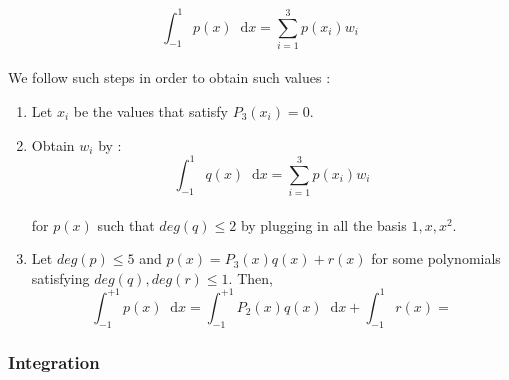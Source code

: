 \documentclass[paper=a4, fontsize=11pt]{scrartcl}
\newcommand*\dif{\mathop{}\!\mathrm{d}}
\begin{document}
\begin{equation}\nonumber
	\int_{-1}^{1} p(x) \dif x = \sum_{i=1}^{3} p(x_i) w_i
\end{equation}\\

We follow such steps in order to obtain such values : \\

\begin{enumerate}
	\item Let $x_i$ be the values that satisfy $P_3(x_i)=0$. 
	\item Obtain $w_i$ by : \\
	
	\begin{equation}\nonumber
		\int_{-1}^{1} q(x) \dif x =  \sum_{i=1}^{3} p(x_i) w_i
	\end{equation}\\
	
	for $p(x)$ such that $deg(q)\leq 2$ by plugging in all the basis $1,x, x^2$.
	
	\item Let $deg(p) \leq 5$ and $p(x)=P_3(x)q(x) + r(x)$ for some polynomials satisfying $deg(q),deg(r)\leq 1$. Then, \\
	
	\begin{equation}\nonumber
		\int_{-1}^{+1} p(x) \dif x = \int_{-1}^{+1} P_2(x) q(x) \dif x + \int_{-1}^{1} r(x) = 
	\end{equation}
\end{enumerate}

\subsubsection{Integration}
\end{document}
